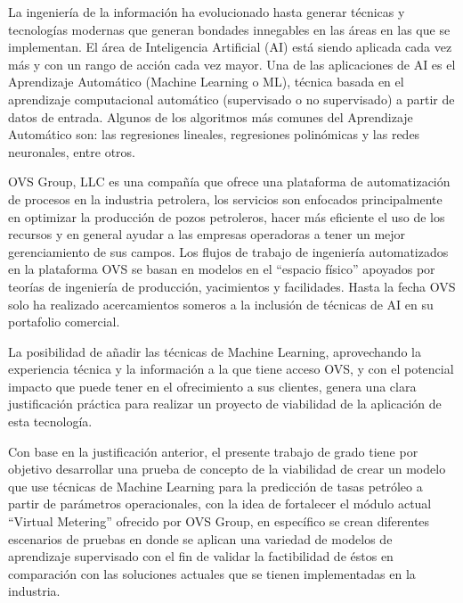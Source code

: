 \label{chapter:introduction}

La ingeniería de la información ha evolucionado hasta generar técnicas y
tecnologías modernas que generan bondades innegables en las áreas en las que se
implementan. El área de Inteligencia Artificial (AI) está siendo aplicada cada
vez más y con un rango de acción cada vez mayor. Una de las aplicaciones de AI
es el Aprendizaje Automático (Machine Learning o ML), técnica basada en el
aprendizaje computacional automático (supervisado o no supervisado) a partir de
datos de entrada. Algunos de los algoritmos más comunes del Aprendizaje
Automático son: las regresiones lineales, regresiones polinómicas y las redes
neuronales, entre otros.

OVS Group, LLC es una compañía que ofrece una plataforma de automatización de
procesos en la industria petrolera, los servicios son enfocados principalmente
en optimizar la producción de pozos petroleros, hacer más eficiente el uso de
los recursos y en general ayudar a las empresas operadoras a tener un mejor
gerenciamiento de sus campos. Los flujos de trabajo de ingeniería automatizados
en la plataforma OVS se basan en modelos en el “espacio físico” apoyados por
teorías de ingeniería de producción, yacimientos y facilidades. Hasta la fecha
OVS solo ha realizado acercamientos someros a la inclusión de técnicas de AI en
su portafolio comercial.

La posibilidad de añadir las técnicas de Machine Learning, aprovechando la
experiencia técnica y la información a la que tiene acceso OVS, y con el
potencial impacto que puede tener en el ofrecimiento a sus clientes, genera una
clara justificación práctica para realizar un proyecto de viabilidad de la
aplicación de esta tecnología.

Con base en la justificación anterior, el presente trabajo de grado tiene por
objetivo desarrollar una prueba de concepto de la viabilidad de crear un modelo
que use técnicas de Machine Learning para la predicción de tasas petróleo a
partir de parámetros operacionales, con la idea de fortalecer el módulo actual
“Virtual Metering” ofrecido por OVS Group, en específico se crean diferentes
escenarios de pruebas en donde se aplican una variedad de modelos de
aprendizaje supervisado con el fin de validar la factibilidad de éstos en
comparación con las soluciones actuales que se tienen implementadas en la
industria.


